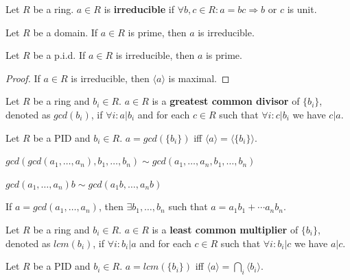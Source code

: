 \documentclass[12pt]{book}
\begin{document}
\begin{definition}
	Let $R$ be a ring. $a\in R$ is {\bf irreducible} if $\forall b,c\in R:a=bc\Rightarrow b$ or $c$ is unit.
\end{definition}

\begin{lemma}
	Let $R$ be a domain. If $a\in R$ is prime, then $a$ is irreducible.
\end{lemma}

\begin{lemma}
	Let $R$ be a p.i.d. If $a\in R$ is irreducible, then $a$ is prime.
\end{lemma}

\begin{proof}
	If $a\in R$ is irreducible, then $\langle a\rangle$ is maximal.
\end{proof}

\begin{definition}
	Let $R$ be a ring and $b_i\in R$. $a\in R$ is a {\bf greatest common divisor} of $\{b_i\}$, denoted as $gcd(b_i)$, if $\forall i:a|b_i$ and for each $c\in R$ such that $\forall i:c|b_i$ we have $c|a$.
\end{definition}

\begin{lemma}
	Let $R$ be a PID and $b_i\in R$. $a=gcd(\{b_i\})$ iff $\langle a\rangle=\langle\{b_i\}\rangle$.
\end{lemma}

\begin{lemma}
	$gcd(gcd(a_1,\dots,a_n),b_1,\dots,b_n)\sim gcd(a_1,\dots,a_n,b_1,\dots,b_n)$
\end{lemma}
\begin{lemma}
	$gcd(a_1,\dots,a_n)b\sim gcd(a_1b,\dots,a_nb)$
\end{lemma}
\begin{lemma}
	If $a=gcd(a_1,\dots,a_n)$, then $\exists b_1,\dots,b_n$ such that $a=a_1b_1+\cdots a_nb_n$.
\end{lemma}

\begin{definition}
	Let $R$ be a ring and $b_i\in R$. $a\in R$ is a {\bf least common multiplier} of $\{b_i\}$, denoted as $lcm(b_i)$, if $\forall i:b_i|a$ and for each $c\in R$ such that $\forall i:b_i|c$ we have $a|c$.
\end{definition}

\begin{lemma}
	Let $R$ be a PID and $b_i\in R$. $a=lcm(\{b_i\})$ iff $\langle a\rangle=\bigcap_i\langle b_i\rangle$.
\end{lemma}
\end{document}
